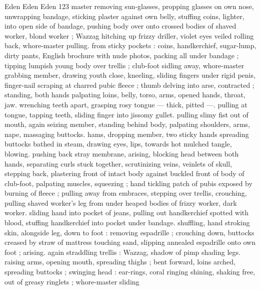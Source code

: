 Eden Eden Eden 123
master removing sun-glasses, propping glasses on own nose,
unwrapping bandage, sticking plaster against own belly, stuffing
coins, lighter, into open side of bandage, pushing body over onto
crossed bodies of shaved worker, blond worker ; Wazzag hitching up
frizzy driller, violet eyes veiled rolling back, whore-master pulling.
from sticky pockets : coins, handkerchief, sugar-lump, dirty pants,
English brochure with nude photos, packing all under bandage ;
tipping lumpish young body over trellis ; club-foot sidling away,
whore-master grabbing member, drawing youth close, kneeling,
sliding fingers under rigid penis, finger-nail scraping at charred
pubic fleece ; thumb delving into arse, contracted ; standing, both
hands palpating loins, belly, torso, arms, opened hands, throat, jaw.
wrenching teeth apart, grasping rosy tongue — thick, pitted —.
pulling at tongue, tapping teeth, sliding finger into jissomy gullet.
pulling slimy fist out of mouth, again seizing member, standing
behind body, palpating shoulders, arms, nape, massaging buttocks.
hams, dropping member, two sticky hands spreading buttocks bathed
in steam, drawing eyes, lips, towards hot mulched tangle, blowing.
pushing back stray membrane, arising, blocking head between both
hands, separating curls stuck together, scrutinizing veins, veinlets of
skull, stepping back, plastering front of intact body against buckled
front of body of club-foot, palpating muscles, squeezing ; hand
tickling patch of pubis exposed by burning of fleece ; pulling away
from embraces, stepping over trellis, crouching, pulling shaved
worker's leg from under heaped bodies of frizzy worker, dark worker.
sliding hand into pocket of jeans, pulling out handkerchief spotted
with blood, stuffing handkerchief into pocket under bandage.
shuffling, hand stroking skin, alongside leg, down to foot : removing
espadrille ; crouching down, buttocks creased by straw of mattress
touching sand, slipping annealed espadrille onto own foot ; arising.
again straddling trellis : Wazzag, shadow of pimp shading legs.
raising arms, opening mouth, spreading thighs ; bent forward, loins
arched, spreading buttocks ; swinging head : ear-rings, coral ringing
shining, shaking free, out of greasy ringlets ; whore-master sliding

